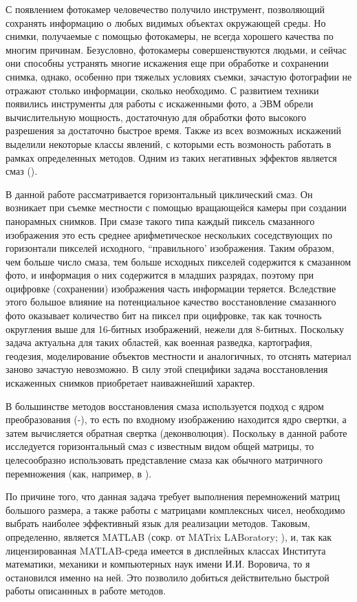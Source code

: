 \documentclass[a4paper]{article}
\theoremstyle{definition}
\begin{document}
    С появлением фотокамер человечество получило инструмент, позволяющий сохранять информацию о любых видимых объектах окружающей среды. Но снимки, получаемые с помощью фотокамеры, не всегда хорошего качества по многим причинам. Безусловно, фотокамеры совершенствуются людьми, и сейчас они способны устранять многие искажения еще при обработке и сохранении снимка, однако, особенно при тяжелых условиях съемки, зачастую фотографии не отражают столько информации, сколько необходимо. С развитием техники появились инструменты для работы с искаженными фото, а ЭВМ обрели вычислительную мощность, достаточную для обработки фото высокого разрешения за достаточно быстрое время. Также из всех возможных искажений выделили некоторые классы явлений, с которыми есть возмоность работать в рамках определенных методов. Одним из таких негативных эффектов является смаз (\cite{blur_def}).


    В данной работе рассматривается горизонтальный циклический смаз. Он возникает при съемке местности с помощью вращающейся камеры при создании панорамных снимков. При смазе такого типа каждый пиксель смазанного изображения это есть среднее арифметическое нескольких соседствующих по горизонтали пикселей исходного, ``правильного' изображения. Таким образом, чем больше число смаза, тем больше исходных пикселей содержится к смазанном фото, и информация о них содержится в младших разрядах, поэтому при оцифровке (сохранении) изображения часть информации теряется. Вследствие этого большое влияние на потенциальное качество восстановление смазанного фото оказывает количество бит на пиксел при оцифровке, так как точность округления выше для 16-битных изображений, нежели для 8-битных. Поскольку задача актуальна для таких областей, как военная разведка, картография, геодезия, моделирование объектов местности и аналогичных, то отснять материал заново зачастую невозможно. В силу этой специфики задача восстановления искаженных снимков приобретает наиважнейший характер.


    В большинстве методов восстановления смаза используется подход с ядром преобразования (\cite{kernel1}-\cite{kernel2}), то есть по входному изображению находится ядро свертки, а затем вычисляется обратная свертка (деконволюция). Поскольку в данной работе исследуется горизонтальный смаз с известным видом общей матрицы, то целесообразно использовать представление смаза как обычного матричного перемножения (как, например, в \cite{model_proc}).


    По причине того, что данная задача требует выполнения перемножений матриц большого размера, а также работы с матрицами комплексных чисел, необходимо выбрать наиболее эффективный язык для реализации методов. Таковым, определенно, является MATLAB (сокр. от MATrix LABoratory; \cite{matlab}), и, так как лицензированная MATLAB-среда имеется в дисплейных классах Института математики, механики и компьютерных наук имени И.И. Воровича, то я остановился именно на ней. Это позволило добиться действительно быстрой работы описаннных в работе методов.
\end{document}
